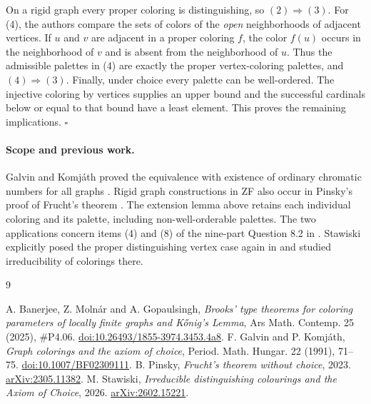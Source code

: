 \documentclass[11pt]{article}
\begin{document}
On a rigid graph every proper coloring is distinguishing, so $(2)\Rightarrow(3)$. For (4), the authors compare the sets of colors of the \emph{open} neighborhoods of adjacent vertices. If $u$ and $v$ are adjacent in a proper coloring $f$, the color $f(u)$ occurs in the neighborhood of $v$ and is absent from the neighborhood of $u$. Thus the admissible palettes in (4) are exactly the proper vertex-coloring palettes, and $(4)\Rightarrow(3)$. Finally, under choice every palette can be well-ordered. The injective coloring by vertices supplies an upper bound and the successful cardinals below or equal to that bound have a least element. This proves the remaining implications. \hfill$\square$

\paragraph{Scope and previous work.}
Galvin and Komj\'ath proved the equivalence with existence of ordinary chromatic numbers for all graphs \cite{gk}. Rigid graph constructions in ZF also occur in Pinsky's proof of Frucht's theorem \cite{pinsky}. The extension lemma above retains each individual coloring and its palette, including non-well-orderable palettes. The two applications concern items (4) and (8) of the nine-part Question 8.2 in \cite{bmg}. Stawiski explicitly posed the proper distinguishing vertex case again in \cite[Conjecture 3(2)]{stawiski} and studied irreducibility of colorings there.

\begin{thebibliography}{9}\raggedright
{} A. Banerjee, Z. Moln\'ar and A. Gopaulsingh, \emph{Brooks' type theorems for coloring parameters of locally finite graphs and K\H{o}nig's Lemma}, Ars Math. Contemp. 25 (2025), \#P4.06. \href{https://doi.org/10.26493/1855-3974.3453.4a8}{doi:10.26493/1855-3974.3453.4a8}.
 F. Galvin and P. Komj\'ath, \emph{Graph colorings and the axiom of choice}, Period. Math. Hungar. 22 (1991), 71--75. \href{https://doi.org/10.1007/BF02309111}{doi:10.1007/BF02309111}.
 B. Pinsky, \emph{Frucht's theorem without choice}, 2023. \href{https://arxiv.org/abs/2305.11382}{arXiv:2305.11382}.
 M. Stawiski, \emph{Irreducible distinguishing colourings and the Axiom of Choice}, 2026. \href{https://arxiv.org/abs/2602.15221}{arXiv:2602.15221}.
\end{thebibliography}
\end{document}
